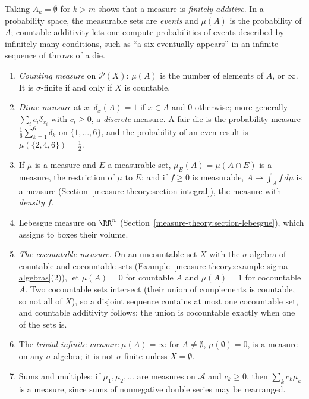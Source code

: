 Taking $A_k = \emptyset$ for $k > m$ shows that a measure is \emph{finitely additive}. In a probability space, the measurable sets are \emph{events} and $\mu(A)$ is the probability of $A$; countable additivity
lets one compute probabilities of events described by infinitely many conditions, such as ``a six eventually appears'' in an infinite sequence of throws of a die.

\begin{example}\label{measure-theory:example-measures}
\begin{enumerate}
\item \emph{Counting measure} on $\mathcal{P}(X)$: $\mu(A)$ is the number of elements of $A$, or $\infty$. It is $\sigma$-finite if and only if $X$ is countable.
\item \emph{Dirac measure} at $x$: $\delta_x(A) = 1$ if $x \in A$ and $0$ otherwise; more generally $\sum_ic_i\delta_{x_i}$ with $c_i \geq 0$, a \emph{discrete} measure. A fair die is the probability measure
$\frac16\sum_{k=1}^6\delta_k$ on $\{1, \ldots, 6\}$, and the probability of an even result is $\mu(\{2, 4, 6\}) = \frac12$.
\item If $\mu$ is a measure and $E$ a measurable set, $\mu_E(A) = \mu(A \cap E)$ is a measure, the restriction of $\mu$ to $E$; and if $f \geq 0$ is measurable, $A \mapsto \int_Af\,d\mu$ is a measure
(Section~\ref{measure-theory:section-integral}), the measure with \emph{density} $f$.
\item Lebesgue measure on $\RR^n$ (Section~\ref{measure-theory:section-lebesgue}), which assigns to boxes their volume.
\item \emph{The cocountable measure.} On an uncountable set $X$ with the $\sigma$-algebra of countable and cocountable sets (Example~\ref{measure-theory:example-sigma-algebras}(2)), let $\mu(A) = 0$ for
countable $A$ and $\mu(A) = 1$ for cocountable $A$. Two cocountable sets intersect (their union of complements is countable, so not all of $X$), so a disjoint sequence contains at most one cocountable
set, and countable additivity follows: the union is cocountable exactly when one of the sets is.
\item The \emph{trivial infinite measure} $\mu(A) = \infty$ for $A \neq \emptyset$, $\mu(\emptyset) = 0$, is a measure on any $\sigma$-algebra; it is not $\sigma$-finite unless $X = \emptyset$.
\item Sums and multiples: if $\mu_1, \mu_2, \ldots$ are measures on $\mathcal{A}$ and $c_k \geq 0$, then $\sum_kc_k\mu_k$ is a measure, since sums of nonnegative double series may be rearranged.
\end{enumerate}
\end{example}

